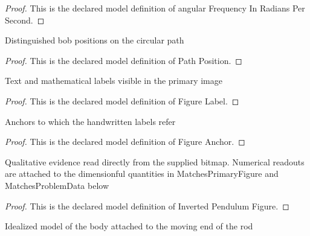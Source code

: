 \begin{proof}
  This is the declared model definition of angular Frequency In Radians Per Second.
\end{proof}
\begin{definition}
  \label{def:physics:phyx-mini-0719:phyxminiproblems-problemphyxmini0719-pathposition}
  Distinguished bob positions on the circular path
\end{definition}
\begin{proof}
  This is the declared model definition of Path Position.
\end{proof}
\begin{definition}
  \label{def:physics:phyx-mini-0719:phyxminiproblems-problemphyxmini0719-figurelabel}
  Text and mathematical labels visible in the primary image
\end{definition}
\begin{proof}
  This is the declared model definition of Figure Label.
\end{proof}
\begin{definition}
  \label{def:physics:phyx-mini-0719:phyxminiproblems-problemphyxmini0719-figureanchor}
  Anchors to which the handwritten labels refer
\end{definition}
\begin{proof}
  This is the declared model definition of Figure Anchor.
\end{proof}
\begin{definition}
  \label{def:physics:phyx-mini-0719:phyxminiproblems-problemphyxmini0719-invertedpendulumfigure}
  Qualitative evidence read directly from the supplied bitmap. Numerical readouts are attached to the dimensionful quantities in MatchesPrimaryFigure and MatchesProblemData below
\end{definition}
\begin{proof}
  This is the declared model definition of Inverted Pendulum Figure.
\end{proof}
\begin{definition}
  \label{def:physics:phyx-mini-0719:phyxminiproblems-problemphyxmini0719-bobmodel}
  Idealized model of the body attached to the moving end of the rod
\end{definition}

